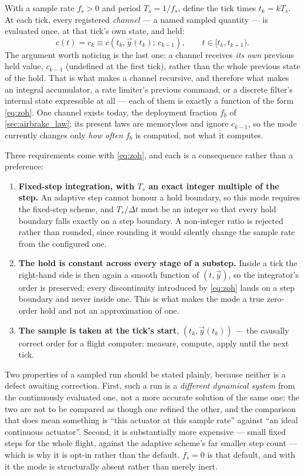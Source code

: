 With a sample rate $f_s>0$ and period $T_s=1/f_s$, define the tick times $t_k=kT_s$. At each tick,
every registered \emph{channel} --- a named sampled quantity --- is evaluated once, at that tick's
own state, and held:
\begin{equation} \label{eq:zoh}
    c(t) = c_k \equiv c\!\left(t_k,\vec{y}(t_k);\,c_{k-1}\right), \qquad t\in[t_k,t_{k+1}).
\end{equation}
The argument worth noticing is the last one: a channel receives \emph{its own} previous held value,
$c_{k-1}$ (undefined at the first tick), rather than the whole previous state of the hold. That is
what makes a channel recursive, and therefore what makes an integral accumulator, a rate limiter's
previous command, or a discrete filter's internal state expressible at all --- each of them is
exactly a function of the form \autoref{eq:zoh}. One channel exists today, the deployment fraction
$f_b$ of \autoref{sec:airbrake_law}; its present laws are memoryless and ignore $c_{k-1}$, so the
mode currently changes only \emph{how often} $f_b$ is computed, not what it computes.

Three requirements come with \autoref{eq:zoh}, and each is a consequence rather than a preference:
\begin{enumerate}
    \item \textbf{Fixed-step integration, with $T_s$ an exact integer multiple of the step.} An
    adaptive step cannot honour a hold boundary, so this mode requires the fixed-step scheme, and
    $T_s/\Delta t$ must be an integer so that every hold boundary falls exactly on a step boundary.
    A non-integer ratio is rejected rather than rounded, since rounding it would silently change
    the sample rate from the configured one.
    \item \textbf{The hold is constant across every stage of a substep.} Inside a tick the
    right-hand side is then again a smooth function of $(t,\vec{y})$, so the integrator's order is
    preserved; every discontinuity introduced by \autoref{eq:zoh} lands on a step boundary and
    never inside one. This is what makes the mode a true zero-order hold and not an approximation
    of one.
    \item \textbf{The sample is taken at the tick's start}, $(t_k,\vec{y}(t_k))$ --- the causally
    correct order for a flight computer: measure, compute, apply until the next tick.
\end{enumerate}

Two properties of a sampled run should be stated plainly, because neither is a defect awaiting
correction. First, such a run is a \emph{different dynamical system} from the continuously
evaluated one, not a more accurate solution of the same one: the two are not to be compared as
though one refined the other, and the comparison that does mean something is ``this actuator at
this sample rate'' against ``an ideal continuous actuator''. Second, it is substantially more
expensive --- small fixed steps for the whole flight, against the adaptive scheme's far smaller
step count --- which is why it is opt-in rather than the default. $f_s=0$ is that default, and with
it the mode is structurally absent rather than merely inert.

